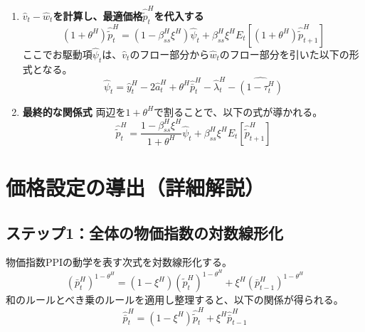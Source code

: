 \begin{enumerate}
    \item\label{itm:appendix_optimal_price_derivation_opt_p_loglin_psi} \textbf{\(\hat{v}_t-\hat{w}_t\)を計算し、最適価格\(\hat{\widetilde{p}}_t^H\)を代入する}
    \begin{equation}
    (1+\theta^H)\hat{\widetilde{p}}_t^H=(1-\beta_{ss}^H\xi^H)\hat{\psi}_t+\beta_{ss}^H\xi^HE_t[(1+\theta^H)\hat{\widetilde{p}}_{t+1}^H]
    \label{eq:appendix_optimal_price_derivation_optimal_price_loglin_sub2_combined}
    \end{equation}
    ここでお駆動項\(\hat{\psi}_t\)は、\(\hat{v}_t\)のフロー部分から\(\hat{w}_t\)のフロー部分を引いた以下の形式となる。
    \begin{equation}
    \hat{\psi}_t=\hat{y}_t^H-2\hat{a}_t^H+\theta^H\hat{\bar{p}}_t^H-\hat{\lambda}_t^H-\widehat{(1-\tau_t^H)}
    \label{eq:appendix_optimal_price_derivation_optimal_price_loglin_sub2_psi_def}
    \end{equation}

    \item\label{itm:appendix_optimal_price_derivation_opt_p_loglin_final} \textbf{最終的な関係式}
    両辺を\(1+\theta^H\)で割ることで、以下の式が導かれる。
    \begin{equation}
    \hat{\widetilde{p}}_t^H=\frac{1-\beta_{ss}^H\xi^H}{1+\theta^H}\hat{\psi}_t+\beta_{ss}^H\xi^HE_t[\hat{\widetilde{p}}_{t+1}^H]
    \label{eq:appendix_optimal_price_derivation_optimal_price_loglin_sub2_final}
    \end{equation}
\end{enumerate}

\section{価格設定の導出（詳細解説）}
\label{sec:appendix_optimal_price_derivation_dynamics}

\subsection*{ステップ1：全体の物価指数の対数線形化}
\label{sec:appendix_optimal_price_derivation_dynamics_sub1}
物価指数PPIの動学を表す次式を対数線形化する。
\begin{equation}
(\bar{p}_t^H)^{1-\theta^H}=(1-\xi^H)(\widetilde{p}_t^H)^{1-\theta^H}+\xi^H(\bar{p}_{t-1}^H)^{1-\theta^H}
\label{eq:appendix_optimal_price_derivation_dynamics_sub1_ppi_dynamics}
\end{equation}
和のルールとべき乗のルールを適用し整理すると、以下の関係が得られる。
\begin{equation}
\hat{\bar{p}}_t^H=(1-\xi^H)\hat{\widetilde{p}}_t^H+\xi^H\hat{\bar{p}}_{t-1}^H
\label{eq:appendix_optimal_price_derivation_dynamics_sub1_ppi_hat}
\end{equation}


